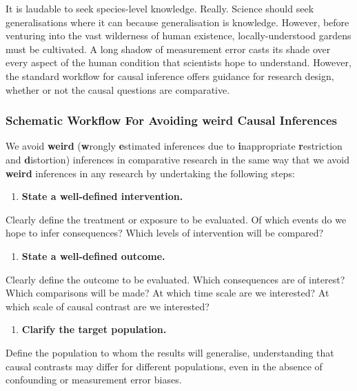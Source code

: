 \documentclass[
  single column]{article}
\providecommand{\tightlist}{%
  \setlength{\itemsep}{0pt}\setlength{\parskip}{0pt}}\usepackage{longtable,booktabs,array}
\begin{document}
It is laudable to seek species-level knowledge. Really. Science should
seek generalisations where it can because generalisation is knowledge.
However, before venturing into the vast wilderness of human existence,
locally-understood gardens must be cultivated. A long shadow of
measurement error casts its shade over every aspect of the human
condition that scientists hope to understand. However, the standard
workflow for causal inference offers guidance for research design,
whether or not the causal questions are comparative.

\subsubsection{Schematic Workflow For Avoiding weird Causal
Inferences}\label{schematic-workflow-for-avoiding-weird-causal-inferences}

We avoid \textbf{weird} (\textbf{w}rongly \textbf{e}stimated inferences
due to \textbf{i}nappropriate \textbf{r}estriction and
\textbf{d}istortion) inferences in comparative research in the same way
that we avoid \textbf{weird} inferences in any research by undertaking
the following steps:

\begin{enumerate}
\def\labelenumi{\arabic{enumi}.}
\tightlist
\item
  \textbf{State a well-defined intervention.}
\end{enumerate}

Clearly define the treatment or exposure to be evaluated. Of which
events do we hope to infer consequences? Which levels of intervention
will be compared?

\begin{enumerate}
\def\labelenumi{\arabic{enumi}.}
\setcounter{enumi}{1}
\tightlist
\item
  \textbf{State a well-defined outcome.}
\end{enumerate}

Clearly define the outcome to be evaluated. Which consequences are of
interest? Which comparisons will be made? At which time scale are we
interested? At which scale of causal contrast are we interested?

\begin{enumerate}
\def\labelenumi{\arabic{enumi}.}
\setcounter{enumi}{2}
\tightlist
\item
  \textbf{Clarify the target population.}
\end{enumerate}

Define the population to whom the results will generalise, understanding
that causal contrasts may differ for different populations, even in the
absence of confounding or measurement error biases.
\end{document}
